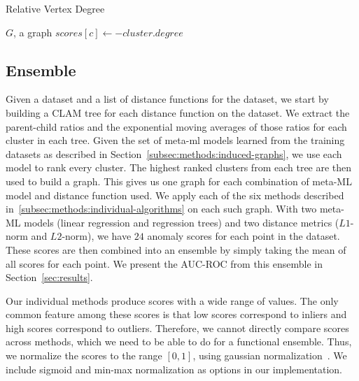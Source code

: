 \begin{algorithm}[h]
    \caption{Relative Vertex Degree}
    \label{alg:rvd}
\begin{algorithmic}[1]
    \REQUIRE $G$, a graph
    \STATE $scores[c] \gets -cluster.degree$
    \ENDFOR
\end{algorithmic}
\end{algorithm}


\subsection{Ensemble}
\label{subsec:methods:ensemble}

Given a dataset and a list of distance functions for the dataset, we start by building a CLAM tree for each distance function on the dataset.
We extract the parent-child ratios and the exponential moving averages of those ratios for each cluster in each tree.
Given the set of meta-ml models learned from the training datasets as described in Section~\ref{subsec:methods:induced-graphs}, we use each model to rank every cluster.
The highest ranked clusters from each tree are then used to build a graph.
This gives us one graph for each combination of meta-ML model and distance function used.
We apply each of the six methods described in~\ref{subsec:methods:individual-algorithms} on each such graph.
With two meta-ML models (linear regression and regression trees) and two distance metrics ($L1$-norm and $L2$-norm), we have $24$ anomaly scores for each point in the dataset.
These scores are then combined into an ensemble by simply taking the mean of all scores for each point.
We present the AUC-ROC from this ensemble in Section~\ref{sec:results}.

Our individual methods produce scores with a wide range of values.
The only common feature among these scores is that low scores correspond to inliers and high scores correspond to outliers.
Therefore, we cannot directly compare scores across methods, which we need to be able to do for a functional ensemble.
Thus, we normalize the scores to the range $[0, 1]$, using gaussian normalization~\cite{kriegel2011interpreting}.
We include sigmoid and min-max normalization as options in our implementation.


